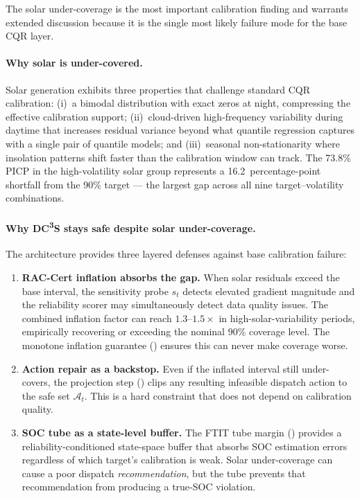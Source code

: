 \documentclass[11pt,a4paper]{article}
\begin{document}
The solar under-coverage is the most important calibration finding and warrants extended discussion because it is the single most likely failure mode for the base CQR layer.

\paragraph{Why solar is under-covered.}
Solar generation exhibits three properties that challenge standard CQR calibration: (i)~a bimodal distribution with exact zeros at night, compressing the effective calibration support; (ii)~cloud-driven high-frequency variability during daytime that increases residual variance beyond what quantile regression captures with a single pair of quantile models; and (iii)~seasonal non-stationarity where insolation patterns shift faster than the calibration window can track. The 73.8\% PICP in the high-volatility solar group represents a 16.2~percentage-point shortfall from the 90\% target --- the largest gap across all nine target--volatility combinations.

\paragraph{Why DC\textsuperscript{3}S stays safe despite solar under-coverage.}
The architecture provides three layered defenses against base calibration failure:

\begin{enumerate}[leftmargin=*,topsep=2pt,itemsep=1pt]
  \item \textbf{RAC-Cert inflation absorbs the gap.} When solar residuals exceed the base interval, the sensitivity probe $s_t$ detects elevated gradient magnitude and the reliability scorer may simultaneously detect data quality issues. The combined inflation factor can reach $1.3$--$1.5\times$ in high-solar-variability periods, empirically recovering or exceeding the nominal 90\% coverage level. The monotone inflation guarantee () ensures this can never make coverage worse.
  \item \textbf{Action repair as a backstop.} Even if the inflated interval still under-covers, the projection step () clips any resulting infeasible dispatch action to the safe set $\mathcal{A}_t$. This is a hard constraint that does not depend on calibration quality.
  \item \textbf{SOC tube as a state-level buffer.} The FTIT tube margin () provides a reliability-conditioned state-space buffer that absorbs SOC estimation errors regardless of which target's calibration is weak. Solar under-coverage can cause a poor dispatch \emph{recommendation}, but the tube prevents that recommendation from producing a true-SOC violation.
\end{enumerate}
\end{document}
